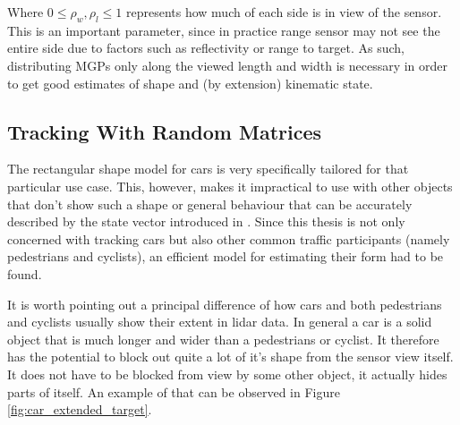 Where $0\leq\rho_w,\rho_l\leq1$ represents how much of each side is in view of the sensor. This is an important parameter, since in practice range sensor may not see the entire side due to factors such as reflectivity or range to target. As such, distributing MGPs only along the viewed length and width is necessary in order to get good estimates of shape and (by extension) kinematic state.

\subsection{Tracking With Random Matrices}

The rectangular shape model for cars is very specifically tailored for that particular use case. This, however, makes it impractical to use with other objects that don't show such a shape or general behaviour that can be accurately described by the state vector introduced in . Since this thesis is not only concerned with tracking cars but also other common traffic participants (namely pedestrians and cyclists), an efficient model for estimating their form had to be found.

It is worth pointing out a principal difference of how cars and both pedestrians and cyclists usually show their extent in lidar data. In general a car is a solid object that is much longer and wider than a pedestrians or cyclist. It therefore has the potential to block out quite a lot of it's shape from the sensor view itself. It does not have to be blocked from view by some other object, it actually hides parts of itself. An example of that can be observed in Figure \ref{fig:car_extended_target}.

